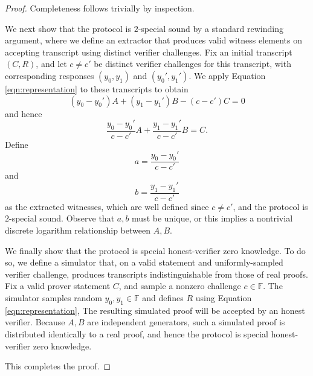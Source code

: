 \documentclass{article}
\newcommand{\F}{\mathbb{F}}
\begin{document}
\begin{proof}
	Completeness follows trivially by inspection.

	We next show that the protocol is $2$-special sound by a standard rewinding argument, where we define an extractor that produces valid witness elements on accepting transcript using distinct verifier challenges.
	Fix an initial transcript $(C,R)$, and let $c \neq c'$ be distinct verifier challenges for this transcript, with corresponding responses $(y_0, y_1)$ and $(y_0', y_1')$.
	We apply Equation \ref{eqn:representation} to these transcripts to obtain
	$$(y_0 - y_0')A + (y_1 - y_1')B - (c - c')C = 0$$
	and hence
	$$\frac{y_0 - y_0'}{c - c'} A + \frac{y_1 - y_1'}{c - c'} B = C.$$
	Define $$a = \frac{y_0 - y_0'}{c - c'}$$ and $$b = \frac{y_1 - y_1'}{c - c'}$$ as the extracted witnesses, which are well defined since $c \neq c'$, and the protocol is $2$-special sound.
	Observe that $a,b$ must be unique, or this implies a nontrivial discrete logarithm relationship between $A,B$.

	We finally show that the protocol is special honest-verifier zero knowledge.
	To do so, we define a simulator that, on a valid statement and uniformly-sampled verifier challenge, produces transcripts indistinguishable from those of real proofs.
	Fix a valid prover statement $C$, and sample a nonzero challenge $c \in \F$.
	The simulator samples random $y_0,y_1 \in \F$ and defines $R$ using Equation \ref{eqn:representation},
	The resulting simulated proof will be accepted by an honest verifier.
	Because $A,B$ are independent generators, such a simulated proof is distributed identically to a real proof, and hence the protocol is special honest-verifier zero knowledge.

	This completes the proof.
\end{proof}




\end{document}
